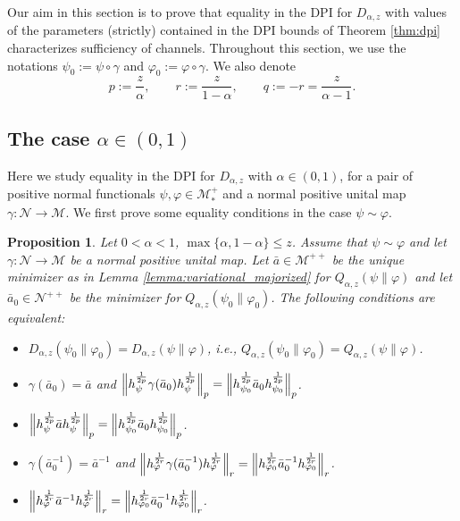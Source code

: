 \documentclass[12pt]{article}
\newtheorem{prop}[theorem]{Proposition}
\theoremstyle{definition}
\theoremstyle{remark}
\numberwithin{equation}{section}
\def\Me{\mathcal M}
\def\Ne{\mathcal N}
\def\ffi{\varphi}
\begin{document}
Our aim in this section is to prove that equality in {\color{red}the} DPI for $D_{\alpha,z}$ with 
values of the parameters (strictly) contained in the DPI bounds of Theorem \ref{thm:dpi}
characterizes sufficiency of channels. Throughout this section, we use the
notations $\psi_0:=\psi\circ\gamma$ and $\ffi_0:=\ffi\circ\gamma$. We also denote
\[
p:=\frac{z}{\alpha},\qquad r:=\frac{z}{1-\alpha},\qquad q:=-r=\frac{z}{\alpha-1}. 
\]


\subsection{The case $\alpha\in (0,1)$}

Here we study equality in {\color{red}the} DPI for $D_{\alpha,z}$ with $\alpha\in (0,1)$,  for a pair of positive
normal functionals $\psi,\ffi\in \Me_*^+$ and a normal positive unital map $\gamma:\Ne\to \Me$. We first
prove some equality conditions  in the case $\psi\sim \ffi$. 

\begin{prop}\label{prop:DPI_equality}
Let $0<\alpha<1$, $\max\{\alpha,1-\alpha\}\le z$.  Assume that $\psi\sim \ffi$ and  let
$\gamma:\Ne\to \Me$ be a normal positive unital map. Let 
$\bar a\in \Me^{++}$  
be the unique minimizer as in Lemma \ref{lemma:variational_majorized} for
$Q_{\alpha,z}(\psi\|\ffi)$ and let $\bar a_0\in \Ne^{++}$ be the minimizer for
$Q_{\alpha,z}(\psi_0\|\ffi_0)$. The following conditions are equivalent:
\begin{itemize}
\item[(i)] $D_{\alpha,z}(\psi_0\|\ffi_0)=D_{\alpha,z}(\psi\|\ffi)$, i.e.,
$Q_{\alpha,z}(\psi_0\|\ffi_0)=Q_{\alpha,z}(\psi\|\ffi)$.
\item[(ii)] $\gamma(\bar a_0)=\bar a$ and
$\Big\|h_\psi^{1\over2p}\gamma(\bar a_0)h_\psi^{1\over2p}\Big\|_{p}
=\Big\|h_{\psi_0}^{1\over2p}\bar a_0h_{\psi_0}^{1\over2p}\Big\|_{p}$.
\item[(iii)] $\Big\|h_\psi^{1\over2p}\bar ah_\psi^{1\over2p}\Big\|_{p}
=\Big\|h_{\psi_0}^{1\over2p}\bar a_0h_{\psi_0}^{1\over2p}\Big\|_{p}$.
\item[(iv)] $\gamma(\bar a_0^{-1})=\bar a^{-1}$ and
$\Big\|h_\ffi^{1\over2r}\gamma(\bar a_0^{-1})h_\ffi^{1\over2r}\Big\|_{r}
=\Big\|h_{\ffi_0}^{1\over2r}\bar a_0^{-1}h_{\ffi_0}^{1\over2r}\Big\|_{r}$.
\item[(v)] $\Big\|h_\ffi^{1\over2r}\bar a^{-1}h_\ffi^{1\over2r}\Big\|_{r}
=\Big\|h_{\ffi_0}^{1\over2r}\bar a_0^{-1}h_{\ffi_0}^{1\over2r}\Big\|_{r}$.
\end{itemize}
\end{prop}
\end{document}
